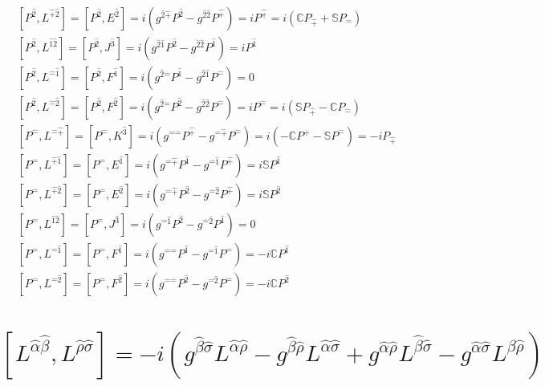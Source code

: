 \documentclass[]{article}
\numberwithin{equation}{section}
\begin{document}
    \begin{align}
    &\left[P^{\hat{2}},L^{\hat{+}\hat{2}}\right]=\left[P^{\hat{2}},E^\hat{2}\right]=i\left(g^{\hat{2}\hat{+}}P^{\hat{2}}-g^{\hat{2}\hat{2}}P^{\hat{+}}\right)=iP^{\hat{+}}=i\left(\mathbb{C}P_{\hat{+}}+\mathbb{S}P_{\hat{-}}\right)\\
    &\left[P^{\hat{2}},L^{\hat{1}\hat{2}}\right]=\left[P^{\hat{2}},J^\hat{3}\right]=i\left(g^{\hat{2}\hat{1}}P^{\hat{2}}-g^{\hat{2}\hat{2}}P^{\hat{1}}\right)=iP^{\hat{1}}\\
    &\left[P^{\hat{2}},L^{\hat{-}\hat{1}}\right]=\left[P^{\hat{2}},F^\hat{1}\right]=i\left(g^{\hat{2}\hat{-}}P^{\hat{1}}-g^{\hat{2}\hat{1}}P^{\hat{-}}\right)=0\\
    &\left[P^{\hat{2}},L^{\hat{-}\hat{2}}\right]=\left[P^{\hat{2}},F^\hat{2}\right]=i\left(g^{\hat{2}\hat{-}}P^{\hat{2}}-g^{\hat{2}\hat{2}}P^{\hat{-}}\right)=iP^{\hat{-}}=i\left(\mathbb{S}P_{\hat{+}}-\mathbb{C}P_{\hat{-}}\right)\\
    &\left[P^{\hat{-}},L^{\hat{-}\hat{+}}\right]=\left[P^{\hat{-}},K^{\hat{3}}\right]=i\left(g^{\hat{-}\hat{-}}P^{\hat{+}}-g^{\hat{-}\hat{+}}P^{\hat{-}}\right)=i\left(-\mathbb{C}P^{\hat{+}}-\mathbb{S}P^{\hat{-}}\right)=-iP_{\hat{+}}\\
    &\left[P^{\hat{-}},L^{\hat{+}\hat{1}}\right]=\left[P^{\hat{-}},E^\hat{1}\right]=i\left(g^{\hat{-}\hat{+}}P^{\hat{1}}-g^{\hat{-}\hat{1}}P^{\hat{+}}\right)=i\mathbb{S}P^{\hat{1}}\\
    &\left[P^{\hat{-}},L^{\hat{+}\hat{2}}\right]=\left[P^{\hat{-}},E^\hat{2}\right]=i\left(g^{\hat{-}\hat{+}}P^{\hat{2}}-g^{\hat{-}\hat{2}}P^{\hat{+}}\right)=i\mathbb{S}P^{\hat{2}}\\
    &\left[P^{\hat{-}},L^{\hat{1}\hat{2}}\right]=\left[P^{\hat{-}},J^\hat{3}\right]=i\left(g^{\hat{-}\hat{1}}P^{\hat{2}}-g^{\hat{-}\hat{2}}P^{\hat{1}}\right)=0\\
    &\left[P^{\hat{-}},L^{\hat{-}\hat{1}}\right]=\left[P^{\hat{-}},F^\hat{1}\right]=i\left(g^{\hat{-}\hat{-}}P^{\hat{1}}-g^{\hat{-}\hat{1}}P^{\hat{-}}\right)=-i\mathbb{C}P^{\hat{1}}\\
    &\left[P^{\hat{-}},L^{\hat{-}\hat{2}}\right]=\left[P^{\hat{-}},F^\hat{2}\right]=i\left(g^{\hat{-}\hat{-}}P^{\hat{2}}-g^{\hat{-}\hat{2}}P^{\hat{-}}\right)=-i\mathbb{C}P^{\hat{2}}
\end{align}

\section{$\left[L^{\hat{\alpha}\hat{\beta}},L^{\hat{\rho}\hat{\sigma}}\right]=-i\left(g^{\hat{\beta}\hat{\sigma}}L^{\hat{\alpha}\hat{\rho}}-g^{\hat{\beta}\hat{\rho}}L^{\hat{\alpha}\hat{\sigma}}+g^{\hat{\alpha}\hat{\rho}}L^{\hat{\beta}\hat{\sigma}}-g^{\hat{\alpha}\hat{\sigma}}L^{\hat{\beta}\hat{\rho}}\right)$}
\end{document}
